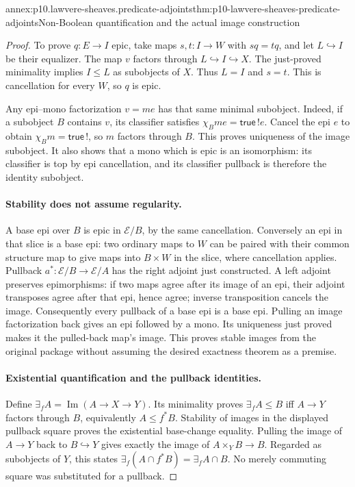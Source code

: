 \begin{annexitem}{annex:p10.lawvere-sheaves.predicate-adjoints}{thm:p10-lawvere-sheaves-predicate-adjoints}{Non-Boolean quantification and the actual image construction}
\begin{proof}
To prove \(q:E\to I\) epic, take maps \(s,t:I\to W\)
with \(sq=tq\), and let \(L\hookrightarrow I\) be their
equalizer.  The map \(v\) factors through
\(L\hookrightarrow I\hookrightarrow X\).  The just-proved
minimality implies \(I\leq L\) as subobjects of \(X\).
Thus \(L=I\) and \(s=t\).  This is cancellation for every
\(W\), so \(q\) is epic.

Any epi--mono factorization \(v=m e\) has that same minimal
subobject.  Indeed, if a subobject \(B\) contains \(v\),
its classifier satisfies \(\chi_Bme=\mathsf{true}\,!e\).
Cancel the epi \(e\) to obtain
\(\chi_Bm=\mathsf{true}\,!\), so \(m\) factors through
\(B\).  This proves uniqueness of the image subobject.
It also shows that a mono which is epic is an isomorphism:
its classifier is top by epi cancellation, and its classifier
pullback is therefore the identity subobject.

\paragraph{Stability does not assume regularity.}
A base epi over \(B\) is epic in \(\mathcal E/B\), by
the same cancellation.  Conversely an epi in that slice is
a base epi: two ordinary maps to \(W\) can be paired with
their common structure map to give maps into \(B\times W\)
in the slice, where cancellation applies.
Pullback \(a^*:\mathcal E/B\to\mathcal E/A\) has the
right adjoint just constructed.  A left adjoint preserves
epimorphisms: if two maps agree after its image of an epi,
their adjoint transposes agree after that epi, hence agree;
inverse transposition cancels the image.  Consequently every
pullback of a base epi is a base epi.  Pulling an image
factorization back gives an epi followed by a mono.  Its
uniqueness just proved makes it the pulled-back map's image.
This proves stable images from the original package without
assuming the desired exactness theorem as a premise.

\paragraph{Existential quantification and the pullback identities.}
Define \(\exists_fA=\operatorname{Im}(A\to X\to Y)\).
Its minimality proves
\(\exists_fA\leq B\) iff \(A\to Y\) factors through
\(B\), equivalently \(A\leq f^*B\).  Stability of images
in the displayed pullback square proves the existential
base-change equality.  Pulling the image of \(A\to Y\)
back to \(B\hookrightarrow Y\) gives exactly the image
of \(A\times_YB\to B\).  Regarded as subobjects of
\(Y\), this states
\(\exists_f(A\cap f^*B)=\exists_fA\cap B\).
No merely commuting square was substituted for a pullback.


\end{proof}
\end{annexitem}
